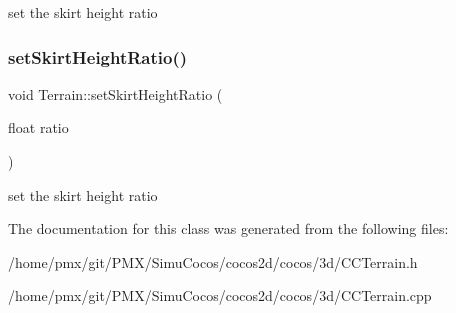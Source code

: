 set the skirt height ratio \mbox{\label{classTerrain_a5a53caf1917be26897f35e35ae5b4f06}} 
\subsubsection{\texorpdfstring{set\+Skirt\+Height\+Ratio()}{setSkirtHeightRatio()}\hspace{0.1cm}{\footnotesize\ttfamily [2/2]}}
{\footnotesize\ttfamily void Terrain\+::set\+Skirt\+Height\+Ratio (\begin{DoxyParamCaption}\item[{float}]{ratio }\end{DoxyParamCaption})}

set the skirt height ratio 

The documentation for this class was generated from the following files\+:\begin{DoxyCompactItemize}
\item 
/home/pmx/git/\+P\+M\+X/\+Simu\+Cocos/cocos2d/cocos/3d/C\+C\+Terrain.\+h\item 
/home/pmx/git/\+P\+M\+X/\+Simu\+Cocos/cocos2d/cocos/3d/C\+C\+Terrain.\+cpp\end{DoxyCompactItemize}
